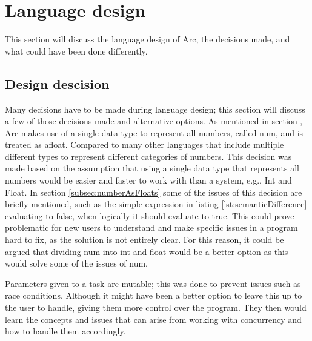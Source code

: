 \section{Language design}

This section will discuss the language design of Arc, the decisions made, and what could have been done differently.

\subsection{Design descision} 
Many decisions have to be made during language design; this section will discuss a few of those decisions made and alternative options.
As mentioned in section , Arc makes use of a single data type to represent all numbers, called num, and is treated as afloat. Compared to many other languages that include multiple different types to represent different categories of numbers. This decision was made based on the assumption that using a single data type that represents all numbers would be easier and faster to work with than a system, e.g., Int and Float. In section \ref{subsec:numberAsFloats} some of the issues of this decision are briefly mentioned, such as the simple expression in listing \ref{lst:semanticDifference} evaluating to false, when logically it should evaluate to true. This could prove problematic for new users to understand and make specific issues in a program hard to fix, as the solution is not entirely clear. For this reason, it could be argued that dividing num into int and float would be a better option as this would solve some of the issues of num.


Parameters given to a task are mutable; this was done to prevent issues such as race conditions. Although it might have been a better option to leave this up to the user to handle, giving them more control over the program. They then would learn the concepts and issues that can arise from working with concurrency and how to handle them accordingly.

